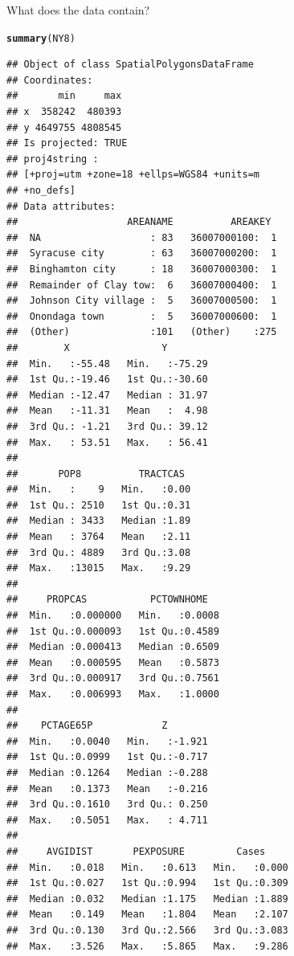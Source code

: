 \documentclass{article}\usepackage[]{graphicx}\usepackage[]{color}
\makeatletter
\newcommand{\hlstd}[1]{\textcolor[rgb]{0.345,0.345,0.345}{#1}}%
\newcommand{\hlkwd}[1]{\textcolor[rgb]{0.737,0.353,0.396}{\textbf{#1}}}%
\newenvironment{kframe}{%
 \def\at@end@of@kframe{}%
 \ifinner\ifhmode%
  \def\at@end@of@kframe{\end{minipage}}%
  \begin{minipage}{\columnwidth}%
 \fi\fi%
 \def\FrameCommand##1{\hskip\@totalleftmargin \hskip-\fboxsep
 \colorbox{shadecolor}{##1}\hskip-\fboxsep
     \hskip-\linewidth \hskip-\@totalleftmargin \hskip\columnwidth}%
 \MakeFramed {\advance\hsize-\width
   \@totalleftmargin\z@ \linewidth\hsize
   \@setminipage}}%
 {\par\unskip\endMakeFramed%
 \at@end@of@kframe}
\newenvironment{knitrout}{}{} %
\makeatother
\begin{document}
What does the data contain?
\begin{knitrout}
\color{fgcolor}\begin{kframe}
\begin{alltt}
\hlkwd{summary}\hlstd{(NY8)}
\end{alltt}
\begin{verbatim}
## Object of class SpatialPolygonsDataFrame
## Coordinates:
##       min     max
## x  358242  480393
## y 4649755 4808545
## Is projected: TRUE 
## proj4string :
## [+proj=utm +zone=18 +ellps=WGS84 +units=m
## +no_defs]
## Data attributes:
##                   AREANAME          AREAKEY   
##  NA                   : 83   36007000100:  1  
##  Syracuse city        : 63   36007000200:  1  
##  Binghamton city      : 18   36007000300:  1  
##  Remainder of Clay tow:  6   36007000400:  1  
##  Johnson City village :  5   36007000500:  1  
##  Onondaga town        :  5   36007000600:  1  
##  (Other)              :101   (Other)    :275  
##        X                Y         
##  Min.   :-55.48   Min.   :-75.29  
##  1st Qu.:-19.46   1st Qu.:-30.60  
##  Median :-12.47   Median : 31.97  
##  Mean   :-11.31   Mean   :  4.98  
##  3rd Qu.: -1.21   3rd Qu.: 39.12  
##  Max.   : 53.51   Max.   : 56.41  
##                                   
##       POP8          TRACTCAS   
##  Min.   :    9   Min.   :0.00  
##  1st Qu.: 2510   1st Qu.:0.31  
##  Median : 3433   Median :1.89  
##  Mean   : 3764   Mean   :2.11  
##  3rd Qu.: 4889   3rd Qu.:3.08  
##  Max.   :13015   Max.   :9.29  
##                                
##     PROPCAS           PCTOWNHOME    
##  Min.   :0.000000   Min.   :0.0008  
##  1st Qu.:0.000093   1st Qu.:0.4589  
##  Median :0.000413   Median :0.6509  
##  Mean   :0.000595   Mean   :0.5873  
##  3rd Qu.:0.000917   3rd Qu.:0.7561  
##  Max.   :0.006993   Max.   :1.0000  
##                                     
##    PCTAGE65P            Z         
##  Min.   :0.0040   Min.   :-1.921  
##  1st Qu.:0.0999   1st Qu.:-0.717  
##  Median :0.1264   Median :-0.288  
##  Mean   :0.1373   Mean   :-0.216  
##  3rd Qu.:0.1610   3rd Qu.: 0.250  
##  Max.   :0.5051   Max.   : 4.711  
##                                   
##     AVGIDIST       PEXPOSURE         Cases      
##  Min.   :0.018   Min.   :0.613   Min.   :0.000  
##  1st Qu.:0.027   1st Qu.:0.994   1st Qu.:0.309  
##  Median :0.032   Median :1.175   Median :1.889  
##  Mean   :0.149   Mean   :1.804   Mean   :2.107  
##  3rd Qu.:0.130   3rd Qu.:2.566   3rd Qu.:3.083  
##  Max.   :3.526   Max.   :5.865   Max.   :9.286  

\end{verbatim}
\end{kframe}
\end{knitrout}
\end{document}
